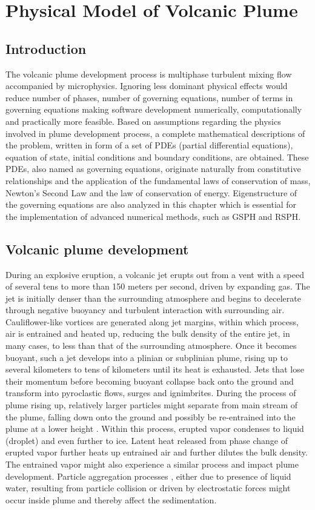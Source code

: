 \chapter{Physical Model of Volcanic Plume} \label{chapter:physics-model}
\section{Introduction}
The volcanic plume development process is multiphase turbulent mixing flow accompanied by microphysics. Ignoring less dominant physical effects would reduce number of phases, number of governing equations, number of terms in governing equations making software development numerically, computationally and practically more feasible. Based on assumptions regarding the physics involved in plume development process, a complete mathematical descriptions of the problem, written in form of a set of PDEs (partial differential equations), equation of state, initial conditions and boundary conditions, are obtained. These PDEs, also named as governing equations, originate naturally
from constitutive relationships and the application of the fundamental laws of conservation of mass, Newton’s Second Law and the law of conservation of energy. Eigenstructure of the governing equations are also analyzed in this chapter which is essential for the implementation of advanced numerical methods, such as GSPH and RSPH.

\section{Volcanic plume development}
During an explosive eruption, a volcanic jet erupts out from a vent with a speed of several tens to more than 150 meters per second, driven by expanding gas. The jet is initially denser than the surrounding atmosphere and begins to decelerate through negative buoyancy and turbulent interaction with surrounding air. Cauliflower-like vortices are generated along jet margins, within which process, air is entrained and heated up, reducing the bulk density of the entire jet, in many cases, to less than that of the surrounding atmosphere. Once it becomes buoyant, such a jet develops into a plinian or subplinian plume, rising up to several kilometers to tens of kilometers until its heat is exhausted. Jets that lose their momentum before becoming buoyant collapse back onto the ground and transform into pyroclastic flows, surges and ignimbrites. During the process of plume rising up, relatively larger particles might separate from main stream of the plume, falling down onto the ground and possibly be re-entrained into the plume at a lower height \citep{ernst1996sedimentation}. Within this process, erupted vapor condenses to liquid (droplet) and even further to ice. Latent heat released from phase change of erupted vapor  further heats up entrained air and further dilutes the bulk density. The entrained vapor might also experience a similar process and impact plume development. Particle aggregation processes \citep{carey1982influence,taddeucci2011aggregation}, either due to presence of liquid water, resulting from particle collision or driven by electrostatic forces might occur inside plume and thereby affect the sedimentation. 


